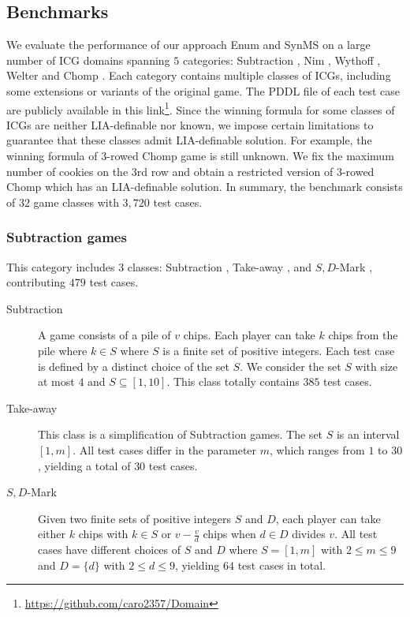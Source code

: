 \documentclass[review]{elsarticle}
\newcommand{\set}[1]{\{ #1 \}}
\begin{document}
\subsection{Benchmarks}
We evaluate the performance of our approach Enum and SynMS on a large number of ICG domains spanning $5$ categories: Subtraction \cite{Yag2001}, Nim \cite{Bou1901}, Wythoff \cite{Wyt1907}, Welter \cite{Wel1952} and Chomp \cite{Sch1952}.
Each category contains multiple classes of ICGs, including some extensions or variants of the original game.
The PDDL file of each test case are publicly available in this link\footnote{\url{https://github.com/caro2357/Domain}}.
Since the winning formula for some classes of ICGs are neither LIA-definable nor known, we impose certain limitations to guarantee that these classes admit LIA-definable solution.
For example, the winning formula of 3-rowed Chomp game is still unknown.
We fix the maximum number of cookies on the 3rd row and obtain a restricted version of 3-rowed Chomp which has an LIA-definable solution.
In summary, the benchmark consists of $32$ game classes with $3,720$ test cases.

\subsubsection{Subtraction games}
This category includes $3$ classes: Subtraction \cite{Yag2001}, Take-away \cite{Gol1966}, and $S,D$-Mark \cite{Sop2016}, contributing $479$ test cases. %

\begin{description}
	\item[Subtraction] 
	A game consists of a pile of $v$ chips.
	Each player can take $k$ chips from the pile where $k \in S$ where $S$ is a finite set of positive integers.
	Each test case is defined by a distinct choice of the set $S$.
	We consider the set $S$ with size at most $4$ and $S \subseteq [1, 10]$.
	This class totally contains $385$ test cases.
	
	\item[Take-away] This class is a simplification of Subtraction games.
	The set $S$ is an interval $[1, m]$.
	All test cases differ in the parameter $m$, which ranges from $1$ to $30$, yielding a total of $30$ test cases.	

	
	\item[$S,D$-Mark] Given two finite sets of positive integers $S$ and $D$, each player can take either $k$ chips with $k \in S$ or $v - \frac{v}{d}$ chips when $d \in D$ divides $v$.
	All test cases have different choices of $S$ and $D$ where $S = [1, m]$ with $2 \leq m \leq 9$ and $D = \set{d}$ with $2 \leq d \leq 9$, yielding $64$ test cases in total.
\end{description}
\end{document}
